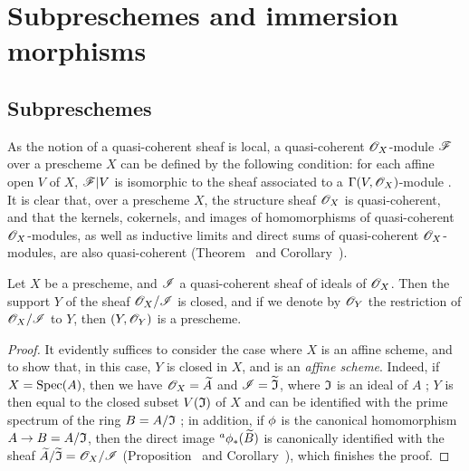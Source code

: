 \section{Subpreschemes and immersion morphisms}
\label{section:subpreschemes-and-immersion-morphisms}

\subsection{Subpreschemes}
\label{subsection:subpreschemes}

\begin{env}[4.1.1]
\label{1.4.1.1}
As the notion of a quasi-coherent sheaf  is local, a quasi-coherent $\mathscr{O}_X$-module $\mathscr{F}$ over a prescheme $X$ can be defined by the following condition: for each affine open $V$ of $X$, $\mathscr{F}|V$ is isomorphic to the sheaf associated to a $\Gamma(V,\mathscr{O}_X)$-module .
It is clear that, over a prescheme $X$, the structure sheaf $\mathscr{O}_X$ is quasi-coherent, and that the kernels, cokernels, and images of homomorphisms of quasi-coherent $\mathscr{O}_X$-modules, as well as inductive limits and direct sums of quasi-coherent $\mathscr{O}_X$-modules, are also quasi-coherent (Theorem~ and Corollary~).
\end{env}

\begin{prop}[4.1.2]
\label{1.4.1.2}
Let $X$ be a prescheme, and $\mathscr{I}$ a quasi-coherent sheaf of ideals of $\mathscr{O}_X$.
Then the support $Y$ of the sheaf $\mathscr{O}_X/\mathscr{I}$ is closed, and if we denote by $\mathscr{O}_Y$ the restriction of $\mathscr{O}_X/\mathscr{I}$ to $Y$, then $(Y,\mathscr{O}_Y)$ is a prescheme.
\end{prop}

\begin{proof}
\label{proof-1.4.1.2}
It evidently suffices  to consider the case where $X$ is an affine scheme, and to show that, in this case, $Y$ is closed in $X$, and is an \emph{affine scheme}.
Indeed, if $X={\mathop{\mathrm{Spec}}\nolimits}(A)$, then we have $\mathscr{O}_X={\widetilde{A}}$ and $\mathscr{I}={\widetilde{\mathfrak{I}}}$, where $\mathfrak{I}$ is an ideal of $A$ ;
$Y$ is then equal to the closed subset $V(\mathfrak{I})$ of $X$ and can be identified with the prime spectrum of the ring $B=A/\mathfrak{I}$ ;
in addition, if $\phi$ is the canonical homomorphism $A\to B=A/\fk{I}$, then the direct image ${}^a\phi_*({\widetilde{B}})$ is canonically identified with the sheaf ${\widetilde{A}}/{\widetilde{\mathfrak{I}}}=\mathscr{O}_X/\mathscr{I}$ (Proposition~ and Corollary~), which finishes the proof.
\end{proof}

